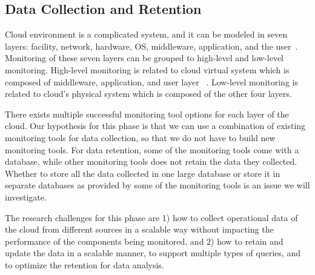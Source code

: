\subsection{Data Collection and Retention}


Cloud environment is a complicated system, and it can be modeled in seven layers: facility, network, hardware, OS, middleware, application, and the user~\cite{spring2011monitoring}. Monitoring of these seven layers can be grouped to high-level and low-level monitoring. High-level monitoring is related to cloud virtual system which is composed of middleware, application, and user layer ~\cite{Aceto2013}. Low-level monitoring is related to cloud’s physical system which is composed of the other four layers. 

There exists multiple successful monitoring tool options for each layer of the cloud. Our hypothesis for this phase is that we can use a combination of existing monitoring tools for data collection, so that we do not have to build new monitoring tools. For data retention, some of the monitoring tools come with a database, while other monitoring tools does not retain the data they collected. Whether to store all the data collected in one large database or store it in separate databases as provided by some of the monitoring tools is an issue we will investigate.


The research challenges for this phase are 1) how to collect operational data of the cloud from different sources in a scalable way without impacting the performance of the components being monitored, and 2)  how to retain and update the data in a scalable manner, to support multiple types of queries, and to optimize the retention for data analysis.


